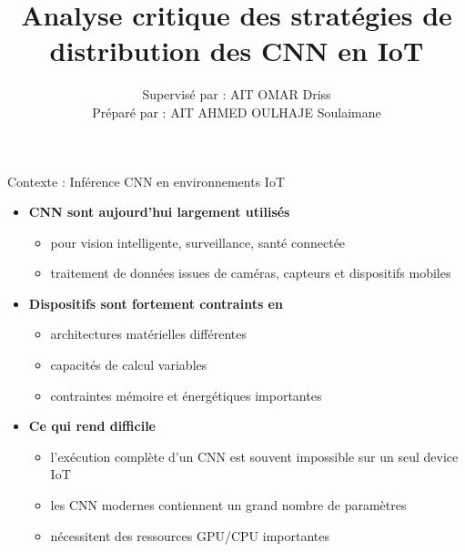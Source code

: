 \documentclass[aspectratio=169]{beamer}
\title{Analyse critique des stratégies de distribution des CNN en IoT}
\author{Supervisé par : AIT OMAR Driss\\
            Préparé par : AIT AHMED OULHAJE Soulaimane}
\institute{Master AIDC — FST Béni Mellal}
\begin{document}
\begin{frame}
  \titlepage
\end{frame}

\begin{frame}{Contexte : Inférence CNN en environnements IoT}

\begin{itemize}

    \item \textbf{CNN sont aujourd’hui largement utilisés}
    \begin{itemize}
        \item pour vision intelligente, surveillance, santé connectée
        \item traitement de données issues de caméras, capteurs et dispositifs mobiles
    \end{itemize}

    \bigskip

    \item \textbf{Dispositifs sont fortement contraints en}
    \begin{itemize}
        \item architectures matérielles différentes
        \item capacités de calcul variables
        \item contraintes mémoire et énergétiques importantes
    \end{itemize}

    \bigskip

    \item \textbf{Ce qui rend difficile}
    \begin{itemize}
        \item l’exécution complète d’un CNN est souvent impossible sur un seul device IoT
        \item les CNN modernes contiennent un grand nombre de paramètres
        \item nécessitent des ressources GPU/CPU importantes
    \end{itemize}

\end{itemize}
\end{frame}
\end{document}
